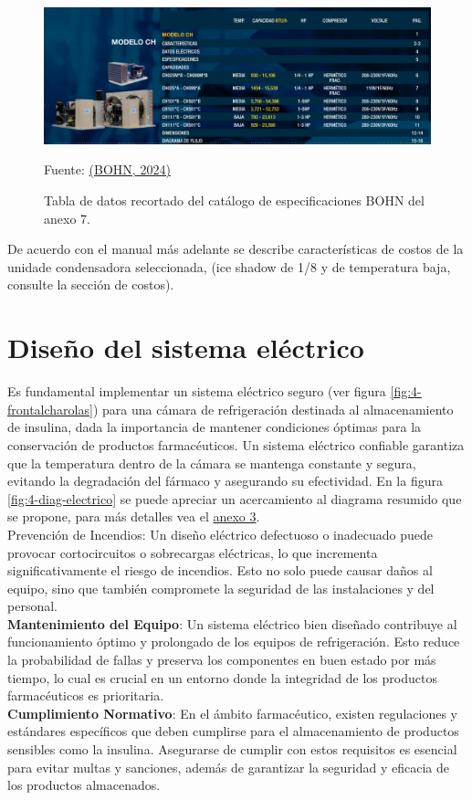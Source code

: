  \begin{figure}[H]
 	\centering
 	\includegraphics[width=0.8\linewidth]{figures/4-bohn-condensador}
 	\caption{Tabla de datos recortado del catálogo de especificaciones BOHN del anexo 7.}
 	Fuente: \hyperref[fig:axo-manual-thermo-king]{(BOHN, 2024)}
 	\label{fig:4-seleccion-condensador}
 \end{figure}
 
 
 
 De acuerdo con el manual más adelante se describe características de costos de la unidade condensadora seleccionada, (ice shadow de 1/8 y de temperatura baja, consulte la sección de costos).
 
 
 \section{Diseño del sistema eléctrico}
 Es fundamental implementar un sistema eléctrico seguro (ver figura \ref{fig:4-frontalcharolas}) para una cámara de refrigeración destinada al almacenamiento de insulina, dada la importancia de mantener condiciones óptimas para la conservación de productos farmacéuticos. Un sistema eléctrico confiable garantiza que la temperatura dentro de la cámara se mantenga constante y segura, evitando la degradación del fármaco y asegurando su efectividad. En la figura \ref{fig:4-diag-electrico} se puede apreciar un acercamiento al diagrama resumido que se propone, para más detalles vea el \hyperref[axo:diag-electrico]{anexo 3}. \\
 Prevención de Incendios: Un diseño eléctrico defectuoso o inadecuado puede provocar cortocircuitos o sobrecargas eléctricas, lo que incrementa significativamente el riesgo de incendios. Esto no solo puede causar daños al equipo, sino que también compromete la seguridad de las instalaciones y del personal.\\
  \textbf{Mantenimiento del Equipo}: Un sistema eléctrico bien diseñado contribuye al funcionamiento óptimo y prolongado de los equipos de refrigeración. Esto reduce la probabilidad de fallas y preserva los componentes en buen estado por más tiempo, lo cual es crucial en un entorno donde la integridad de los productos farmacéuticos es prioritaria.\\
\textbf{Cumplimiento Normativo}: En el ámbito farmacéutico, existen regulaciones y estándares específicos que deben cumplirse para el almacenamiento de productos sensibles como la insulina. Asegurarse de cumplir con estos requisitos es esencial para evitar multas y sanciones, además de garantizar la seguridad y eficacia de los productos almacenados.


